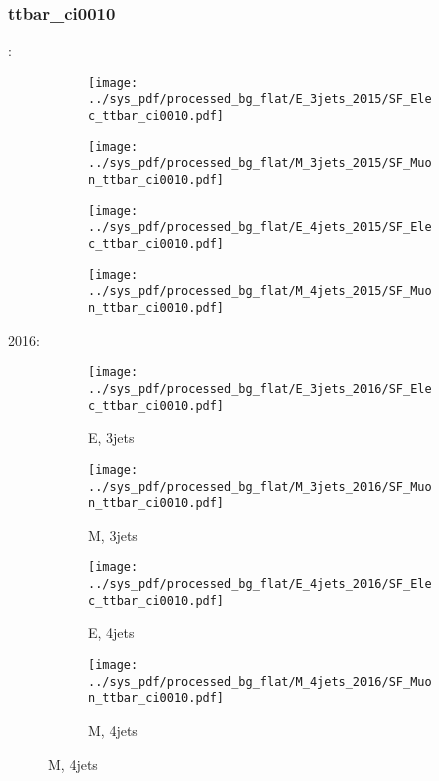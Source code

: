 \documentclass{beamer}
\begin{document}
\begin{frame}
\frametitle{ttbar_ci0010}
\fontsize{5}{1}:
\begin{figure}
\centering
\begin{subfigure}[b]{0.24\textwidth}
\texttt{[image: ../sys\_pdf/processed\_bg\_flat/E\_3jets\_2015/SF\_Elec\_ttbar\_ci0010.pdf]}
\end{subfigure}
\begin{subfigure}[b]{0.24\textwidth}
\texttt{[image: ../sys\_pdf/processed\_bg\_flat/M\_3jets\_2015/SF\_Muon\_ttbar\_ci0010.pdf]}
\end{subfigure}
\begin{subfigure}[b]{0.24\textwidth}
\texttt{[image: ../sys\_pdf/processed\_bg\_flat/E\_4jets\_2015/SF\_Elec\_ttbar\_ci0010.pdf]}
\end{subfigure}
\begin{subfigure}[b]{0.24\textwidth}
\texttt{[image: ../sys\_pdf/processed\_bg\_flat/M\_4jets\_2015/SF\_Muon\_ttbar\_ci0010.pdf]}
\end{subfigure}
\end{figure}
2016:
\begin{figure}
\centering
\begin{subfigure}[b]{0.24\textwidth}
\texttt{[image: ../sys\_pdf/processed\_bg\_flat/E\_3jets\_2016/SF\_Elec\_ttbar\_ci0010.pdf]}
\captionsetup{font=tiny}
\caption{E, 3jets}
\end{subfigure}
\begin{subfigure}[b]{0.24\textwidth}
\texttt{[image: ../sys\_pdf/processed\_bg\_flat/M\_3jets\_2016/SF\_Muon\_ttbar\_ci0010.pdf]}
\captionsetup{font=tiny}
\caption{M, 3jets}
\end{subfigure}
\begin{subfigure}[b]{0.24\textwidth}
\texttt{[image: ../sys\_pdf/processed\_bg\_flat/E\_4jets\_2016/SF\_Elec\_ttbar\_ci0010.pdf]}
\captionsetup{font=tiny}
\caption{E, 4jets}
\end{subfigure}
\begin{subfigure}[b]{0.24\textwidth}
\texttt{[image: ../sys\_pdf/processed\_bg\_flat/M\_4jets\_2016/SF\_Muon\_ttbar\_ci0010.pdf]}
\captionsetup{font=tiny}
\caption{M, 4jets}
\end{subfigure}
\end{figure}
\end{frame}
\end{document}
